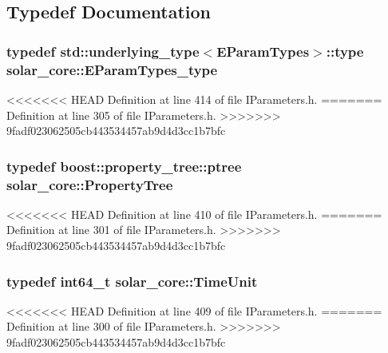 \subsection{Typedef Documentation}
\hypertarget{namespacesolar__core_a256e8e2dc052f522b522d3f90b294caf}{}
\subsubsection[{E\+Param\+Types\+\_\+type}]{\setlength{\rightskip}{0pt plus 5cm}typedef std\+::underlying\+\_\+type$<${\bf E\+Param\+Types}$>$\+::type {\bf solar\+\_\+core\+::\+E\+Param\+Types\+\_\+type}}\label{namespacesolar__core_a256e8e2dc052f522b522d3f90b294caf}


<<<<<<< HEAD
Definition at line 414 of file I\+Parameters.\+h.
=======
Definition at line 305 of file I\+Parameters.\+h.
>>>>>>> 9fadf023062505cb443534457ab9d4d3cc1b7bfc

\hypertarget{namespacesolar__core_adeda2737d6938c190eb774a5b2495045}{}
\subsubsection[{Property\+Tree}]{\setlength{\rightskip}{0pt plus 5cm}typedef boost\+::property\+\_\+tree\+::ptree {\bf solar\+\_\+core\+::\+Property\+Tree}}\label{namespacesolar__core_adeda2737d6938c190eb774a5b2495045}


<<<<<<< HEAD
Definition at line 410 of file I\+Parameters.\+h.
=======
Definition at line 301 of file I\+Parameters.\+h.
>>>>>>> 9fadf023062505cb443534457ab9d4d3cc1b7bfc

\hypertarget{namespacesolar__core_a4b5949d07259da6f8a20d12a30403e90}{}
\subsubsection[{Time\+Unit}]{\setlength{\rightskip}{0pt plus 5cm}typedef int64\+\_\+t {\bf solar\+\_\+core\+::\+Time\+Unit}}\label{namespacesolar__core_a4b5949d07259da6f8a20d12a30403e90}


<<<<<<< HEAD
Definition at line 409 of file I\+Parameters.\+h.
=======
Definition at line 300 of file I\+Parameters.\+h.
>>>>>>> 9fadf023062505cb443534457ab9d4d3cc1b7bfc



